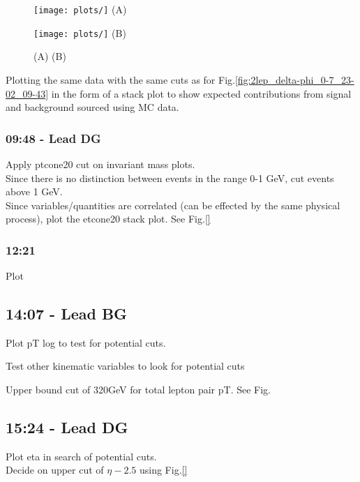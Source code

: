 
\begin{figure}[h!]
    \centering
    \begin{minipage}{0.5\textwidth}
        \centering
        \texttt{[image: plots/]}
        (A)
    \end{minipage}\hfill
    \begin{minipage}{0.5\textwidth}
        \centering
        \texttt{[image: plots/]}
        (B)
    \end{minipage}
    \caption{(A) (B)}
    \label{fig:}
\end{figure}





Plotting the same data with the same cuts as for Fig.\ref{fig:2lep_delta-phi_0-7_23-02_09-43} in the form of a stack plot to show expected contributions from signal and background sourced using MC data.

\subsubsection*{09:48 - Lead DG}
Apply ptcone20 cut on invariant mass plots.
\\
Since there is no distinction between events in the range 0-1 GeV, cut events above 1 GeV.
\\
Since variables/quantities are correlated (can be effected by the same physical process), plot the etcone20 stack plot.   See Fig.\ref{}


\subsubsection*{12:21}
Plot



\subsection*{14:07 - Lead BG}
Plot pT log to test for potential cuts.

Test other kinematic variables to look for potential cuts

Upper bound cut of 320GeV for total lepton pair pT.  See Fig.{}

\subsection*{15:24 - Lead DG}
Plot eta in search of potential cuts.
\\
Decide on upper cut of $\eta- 2.5$ using Fig.\ref{}


